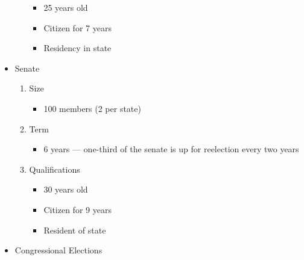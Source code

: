 \documentclass[12pt]{article}
\begin{document}
\begin{itemize}
\begin{enumerate}
        \begin{itemize}

          \item 25 years old

          \item Citizen for 7 years

          \item Residency in state

        \end{itemize}

    \end{enumerate}

  \item Senate

    \begin{enumerate}

      \item Size

        \begin{itemize}

          \item 100 members (2 per state)

        \end{itemize}

      \item Term

        \begin{itemize}

          \item 6 years — one-third of the senate is up for reelection every two years

        \end{itemize}

      \item Qualifications

        \begin{itemize}

          \item 30 years old

          \item Citizen for 9 years

          \item Resident of state

        \end{itemize}

    \end{enumerate}

  \item Congressional Elections


\end{itemize}
\end{document}
